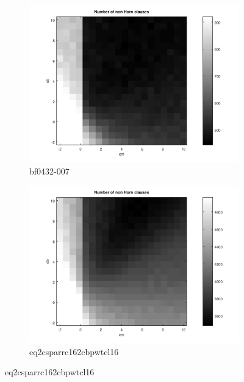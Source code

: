 \documentclass[12pt,a4paper]{article}
\begin{document}
\begin{figure}[H]
  \begin{subfigure}{0.5\textwidth}
    \includegraphics[width=\textwidth]{probSAT/probSATpoly_bf0432-007[SKIP=0].png}
    \caption{bf0432-007}
  \end{subfigure}
  \begin{subfigure}{0.5\textwidth}
    \includegraphics[width=\textwidth]{probSAT/probSATpoly_eq2csparrc162cbpwtcl16[SKIP=0].png}
    \caption{eq2csparrc162cbpwtcl16}
  \end{subfigure}
  

\end{figure}
\end{document}
